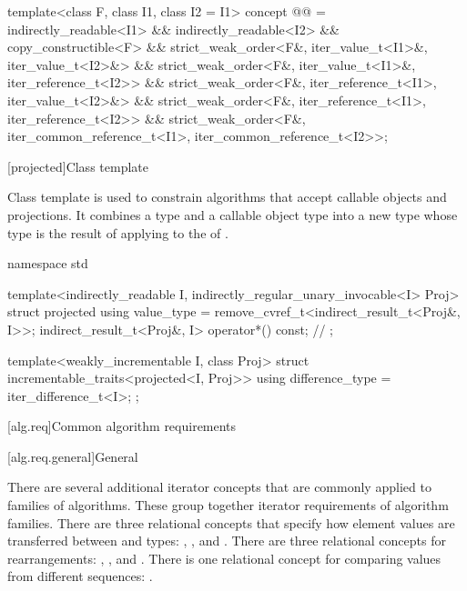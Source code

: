 \begin{codeblock}
{  template<class F, class I1, class I2 = I1>
    concept @@ =
      indirectly_readable<I1> && indirectly_readable<I2> &&
      copy_constructible<F> &&
      strict_weak_order<F&, iter_value_t<I1>&, iter_value_t<I2>&> &&
      strict_weak_order<F&, iter_value_t<I1>&, iter_reference_t<I2>> &&
      strict_weak_order<F&, iter_reference_t<I1>, iter_value_t<I2>&> &&
      strict_weak_order<F&, iter_reference_t<I1>, iter_reference_t<I2>> &&
      strict_weak_order<F&, iter_common_reference_t<I1>, iter_common_reference_t<I2>>;
}
\end{codeblock}

[projected]{Class template }

\pnum
Class template  is used to constrain algorithms
that accept callable objects and projections.
It combines a  type  and
a callable object type  into a new  type
whose  type is the result of applying
 to the  of .

%
\begin{codeblock}
namespace std {
  template<indirectly_readable I, indirectly_regular_unary_invocable<I> Proj>
  struct projected {
    using value_type = remove_cvref_t<indirect_result_t<Proj&, I>>;
    indirect_result_t<Proj&, I> operator*() const;              // \notdef
  };

  template<weakly_incrementable I, class Proj>
  struct incrementable_traits<projected<I, Proj>> {
    using difference_type = iter_difference_t<I>;
  };
}
\end{codeblock}

[alg.req]{Common algorithm requirements}

[alg.req.general]{General}

\pnum
There are several additional iterator concepts that are commonly applied
to families of algorithms. These group together iterator requirements
of algorithm families.
There are three relational concepts that specify
how element values are transferred between
 and  types:
,
, and
.
There are three relational concepts for rearrangements:
,
, and
.
There is one relational concept for comparing values from different sequences:
.

